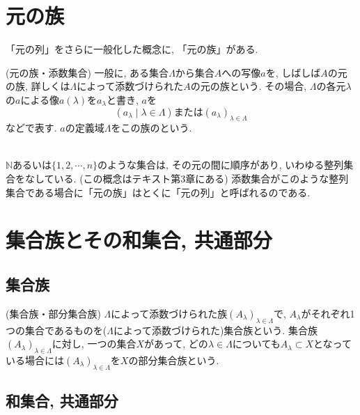 \documentclass[a4j]{jsarticle}
\begin{document}
\section{元の族}

「元の列」をさらに一般化した概念に, 「元の族」がある. \\

\begin{itembox}[l]{ (元の族・添数集合)}
	一般に, ある集合$\Lambda$から集合$A$への写像$a$を, しばしば$A$の元の族, 詳しくは$\Lambda$によって添数づけられた$A$の元の族という. その場合, $\Lambda$の各元$\lambda$の$a$による像$a(\lambda)$を$a_\lambda$と書き, $a$を$$ (a_\lambda \mid \lambda \in \Lambda) または (a_\lambda)_{\lambda \in \Lambda} $$などで表す. $a$の定義域$\Lambda$をこの族のという.
\end{itembox}\\

 $\mathbb{N}$あるいは$\{1,2,\cdots,n\}$のような集合は, その元の間に順序があり, いわゆる整列集合をなしている. (この概念はテキスト\cite{text}第3章にある) 添数集合がこのような整列集合である場合に「元の族」はとくに「元の列」と呼ばれるのである.

\section{集合族とその和集合, 共通部分}

\subsection{集合族}

\begin{itembox}[l]{ (集合族・部分集合族)}
	$\Lambda$によって添数づけられた族$(A_\lambda)_{\lambda \in \Lambda}$で, $A_\lambda$がそれぞれ1つの集合であるものを($\Lambda$によって添数づけられた)集合族という. 集合族$(A_\lambda)_{\lambda \in \Lambda}$に対し, 一つの集合$X$があって, どの$\lambda \in \Lambda$についても$A_\lambda \subset X$となっている場合には$(A_\lambda)_{\lambda \in \Lambda}$を$X$の部分集合族という.
\end{itembox}

\subsection{和集合, 共通部分}
\end{document}
